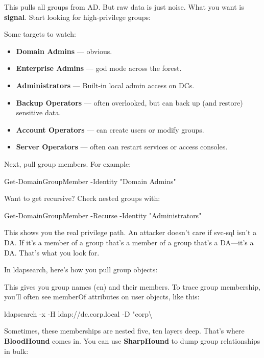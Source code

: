 This pulls all groups from AD. But raw data is just noise. What you want is \textbf{signal}. Start looking for high-privilege groups:

Some targets to watch:
\begin{itemize}
    \item \textbf{Domain Admins} — obvious.

    \item \textbf{Enterprise Admins} — god mode across the forest.

    \item \textbf{Administrators} — Built-in local admin access on DCs.

    \item \textbf{Backup Operators} — often overlooked, but can back up (and restore) sensitive data.

    \item \textbf{Account Operators} — can create users or modify groups.

    \item \textbf{Server Operators} — often can restart services or access consoles.

\end{itemize}
Next, pull group members. For example:

Get-DomainGroupMember -Identity "Domain Admins"

Want to get recursive? Check nested groups with:


Get-DomainGroupMember -Recurse -Identity "Administrators"

This shows you the real privilege path. An attacker doesn’t care if svc-sql isn’t a DA. If it’s a member of a group that’s a member of a group that’s a DA—it’s a DA. That’s what you look for.

In ldapsearch, here’s how you pull group objects:



This gives you group names (cn) and their members. To trace group membership, you’ll often see memberOf attributes on user objects, like this:

ldapsearch -x -H ldap://dc.corp.local -D "corp\textbackslash{}%

Sometimes, these memberships are nested five, ten layers deep. That’s where \textbf{BloodHound} comes in. You can use \textbf{SharpHound} to dump group relationships in bulk:

